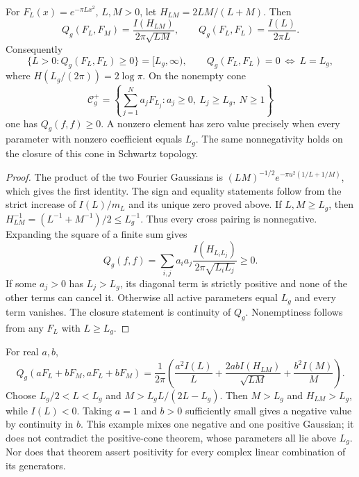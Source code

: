 \begin{theorem}
\label{v4-arith:pres74:aux-cone}
For $F_L(x)=e^{-\pi Lx^2}$, $L,M>0$, let $H_{LM}=2LM/(L+M)$.
Then
\[
 Q_g(F_L,F_M)=\frac{I(H_{LM})}{2\pi\sqrt{LM}},\qquad
 Q_g(F_L,F_L)=\frac{I(L)}{2\pi L}.
\]
Consequently
\[
 \{L>0:Q_g(F_L,F_L)\ge0\}=[L_g,\infty),
 \qquad Q_g(F_L,F_L)=0\ \Longleftrightarrow\ L=L_g,
\]
where $H(L_g/(2\pi))=2\log\pi$.
On the nonempty cone
\[
 \mathcal C_g^+=\left\{\sum_{j=1}^N a_jF_{L_j}:
                   a_j\ge0,\ L_j\ge L_g,\ N\ge1\right\}
\]
one has $Q_g(f,f)\ge0$. A nonzero element has zero value precisely
when every parameter with nonzero coefficient equals $L_g$.
The same nonnegativity holds on the closure of this cone in
Schwartz topology.
\end{theorem}
\begin{proof}
The product of the two Fourier Gaussians is
$(LM)^{-1/2}e^{-\pi u^2(1/L+1/M)}$, which gives the first identity.
The sign and equality statements follow from the strict increase of
$I(L)/m_L$ and its unique zero proved above.
If $L,M\ge L_g$, then
$H_{LM}^{-1}=(L^{-1}+M^{-1})/2\le L_g^{-1}$.
Thus every cross pairing is nonnegative. Expanding the square of a
finite sum gives
\[
 Q_g(f,f)=\sum_{i,j}a_i a_j
             \frac{I(H_{L_iL_j})}{2\pi\sqrt{L_iL_j}}\ge0.
\]
If some $a_j>0$ has $L_j>L_g$, its diagonal term is strictly
positive and none of the other terms can cancel it. Otherwise all
active parameters equal $L_g$ and every term vanishes.
The closure statement is continuity of $Q_g$. Nonemptiness follows
from any $F_L$ with $L\ge L_g$.
\end{proof}

\begin{example}
\label{v4-arith:pres74:two-gaussians}
For real $a,b$,
\[
 Q_g(aF_L+bF_M,aF_L+bF_M)
 =\frac1{2\pi}\left(\frac{a^2I(L)}L
   +\frac{2abI(H_{LM})}{\sqrt{LM}}+\frac{b^2I(M)}M\right).
\]
Choose $L_g/2<L<L_g$ and
$M>L_gL/(2L-L_g)$. Then $M>L_g$ and $H_{LM}>L_g$, while
$I(L)<0$. Taking $a=1$ and $b>0$ sufficiently small gives a
negative value by continuity in $b$. This example mixes one
negative and one positive Gaussian; it does not contradict the
positive-cone theorem, whose parameters all lie above $L_g$.
Nor does that theorem assert positivity for every complex linear
combination of its generators.
\end{example}

